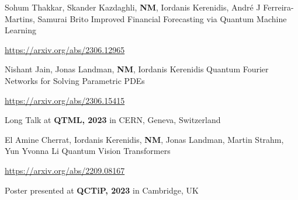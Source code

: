 

\begin{cventries}

  \cventry
    {Sohum Thakkar, Skander Kazdaghli, \textbf{NM}, Iordanis Kerenidis, André J Ferreira-Martins, Samurai Brito} %
    {Improved Financial Forecasting via Quantum Machine Learning} %
    {} %
    {}
    {
      \begin{cvitems} %
        \item {\href{https://arxiv.org/abs/2306.12965}{https://arxiv.org/abs/2306.12965}}
      \end{cvitems}
    }

  \cventry
    {Nishant Jain, Jonas Landman, \textbf{NM}, Iordanis Kerenidis} %
    {Quantum Fourier Networks for Solving Parametric PDEs} %
    {} %
    {}
    {
      \begin{cvitems} %
        \item {\href{https://arxiv.org/abs/2306.15415}{https://arxiv.org/abs/2306.15415}}
        \item {Long Talk at \textbf{QTML, 2023} in CERN, Geneva, Switzerland}
      \end{cvitems}
    }

  \cventry
    {El Amine Cherrat, Iordanis Kerenidis, \textbf{NM}, Jonas Landman, Martin Strahm, Yun Yvonna Li} %
    {Quantum Vision Transformers} %
    {} %
    {}
    {
      \begin{cvitems} %
        \item {\href{https://arxiv.org/abs/2209.08167}{https://arxiv.org/abs/2209.08167}}
        \item {Poster presented at \textbf{QCTiP, 2023} in Cambridge, UK}
      \end{cvitems}
    }


\end{cventries}
